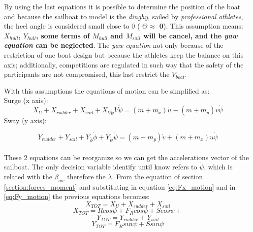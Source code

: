 By using the last equations it is possible to determine the position of the boat and because the sailboat to model is the \textit{dinghy}, sailed by \textit{professional athletes}, the heel angle is considered small close to 0 ( \textbf{$\Theta \approx$ 0}). This assumption means: \textbf{$X_{hull}$, $Y_{hull}$, some terms of $M_{hull}$ and $M_{sail}$ will be cancel, and the \textit{yaw equation} can be neglected}. The \textit{yaw equation} not only because of the restriction of one boat design but because the athletes keep the balance on this axis; additionally, competitions are regulated in such way that the safety of the participants are not compromised, this last restrict the $V_{boat}$. \par 

With this assumptions the equations of motion can be simplified as: \\
Surge  (x axis):
\begin{equation}
       X_{U}+X_{rudder}+X_{sail}+X_{V\Dot{\psi}}V\Dot{\psi}  =(m+m_{x})\Dot{u}-(m+m_{y})v\Dot{\psi}
\end{equation}\label{eq:Fx_motion}
Sway  (y axis):\par 
\begin{equation}
\label{eq:Fy_motion}
Y_{rudder} + Y_{sail} + Y_{\Dot{\phi}} \Dot{\phi} + Y_{\Dot{\psi}} \Dot{\psi} 
=(m + m_{y})\Dot{v}  + (m + m_{x})u \Dot{\psi}
\end{equation}
\\
These 2 equations can be reorganize so we can get the accelerations vector of the sailboat. The only decision variable identify until know refers to $\Dot{\psi}$, which is related with the $\beta_{aw}$ therefore the $\lambda$. 
From the equation of section \ref{section:forces_moment} and substituting in equation \ref{eq:Fx_motion} and in \ref{eq:Fy_motion} the previous equations becomes:
\begin{equation}\label{eq:X_tot}
    X_{TOT}=X_{U}+X_{rudder}+X_{sail}
\end{equation}
\begin{equation}\label{eq:X_tot2}
    X_{TOT}=Rcos\psi+F_{R}cos\psi+Scos\psi+
\end{equation}
\begin{equation}\label{eq:y_tot}
    Y_{TOT}=Y_{rudder}+Y_{sail}
\end{equation}
\begin{equation}
    Y_{TOT}=F_{R}sin\psi+S sin\psi
\end{equation}

